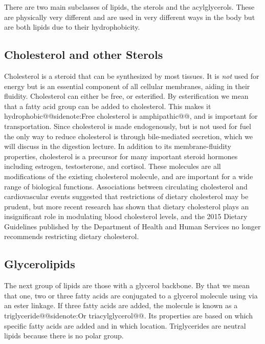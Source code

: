 \documentclass{tufte-handout}
\makeatletter
\def\sidenote#1{@@sidenote:#1@@}
\makeatother
\begin{document}
There are two main subclasses of lipids, the sterols and the acylglycerols.  These are physically very different and are used in very different ways in the body but are both lipids due to their hydrophobicity.

\subsection{Cholesterol and other Sterols}

Cholesterol is a steroid that can be synthesized by most tissues.  It is \emph{not} used for energy but is an essential component of all cellular membranes, aiding in their fluidity.  Cholesterol can either be free, or esterified.  By esterification we mean that a fatty acid group can be added to cholesterol.  This makes it hydrophobic\sidenote{Free cholesterol is amphipathic}, and is important for transportation.  Since cholesterol is made endogenously, but is not used for fuel the only way to reduce cholesterol is through bile-mediated secretion, which we will discuss in the digestion lecture.  In addition to its membrane-fluidity properties, cholesterol is a precursor for many important steroid hormones including estrogen, testosterone, and cortisol.  These molecules are all modifications of the existing cholesterol molecule, and are important for a wide range of biological functions.  Associations between circulating cholesterol and cardiovascular events suggested that restrictions of dietary cholesterol may be prudent, but more recent research has shown that dietary cholesterol plays an insignificant role in modulating blood cholesterol levels, and the 2015 Dietary Guidelines published by the Department of Health and Human Services no longer recommends restricting dietary cholesterol\cite{USDA2015}.

\subsection{Glycerolipids}

The next group of lipids are those with a glycerol backbone.  By that we mean that one, two or three fatty acids are conjugated to a glycerol molecule using via an ester linkage.  If three fatty acids are added, the molecule is known as a triglyceride\sidenote{Or triacylglycerol}. Its properties are based on which specific fatty acids are added and in which location.  Triglycerides are neutral lipids because there is no polar group.
\end{document}
